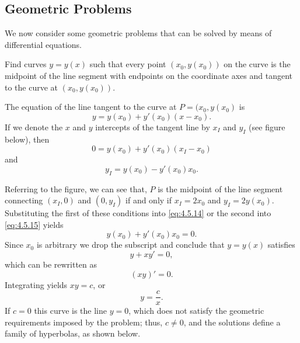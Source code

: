 \documentclass{ximera}
\begin{document}
 
\subsection*{Geometric Problems}
 
We now consider some geometric problems that can be solved by means of
differential equations.
 
\begin{example}\label{example:4.5.7}
Find curves $y=y(x)$ such that every point $(x_0,y(x_0))$ on the curve
is the midpoint of the line segment with endpoints on the coordinate
axes and tangent to the curve at $(x_0,y(x_0))$.
 
\begin{explanation}
 The equation of the  line tangent to the curve at $P=(x_0,y(x_0)$ is
$$
y=y(x_0)+y'(x_0)(x-x_0).
$$
If we denote the $x$ and $y$ intercepts of the tangent line by $x_I$
and $y_I$ (see figure below), then
\begin{equation} \label{eq:4.5.14}
0=y(x_0)+y'(x_0)(x_I-x_0)
\end{equation}
 and
\begin{equation} \label{eq:4.5.15}
y_I=y(x_0)-y'(x_0)x_0.
\end{equation}

\begin{center}
\end{center}

 
Referring to the figure, we can see that, $P$ is the midpoint of the line segment
connecting $(x_I,0)$ and $(0,y_I)$ if and only if $x_I=2x_0$ and
$y_I=2y(x_0)$. Substituting the first of these conditions into
\eqref{eq:4.5.14} or the second into \eqref{eq:4.5.15} yields
$$
y(x_0)+y'(x_0)x_0=0.
$$
Since $x_0$ is arbitrary we drop the subscript and conclude that
$y=y(x)$  satisfies
$$
y+xy'=0,
$$
which can be rewritten as
$$
(xy)'=0.
$$
Integrating  yields $xy=c$,  or
$$
y=\frac{c}{x}.
$$
If $c=0$ this curve is the line $y=0$, which does not satisfy the
geometric requirements imposed by the problem;   thus, $c\neq 0$, and the
solutions define a family of hyperbolas, as shown below.


\end{explanation}
\end{example}
\end{document}
